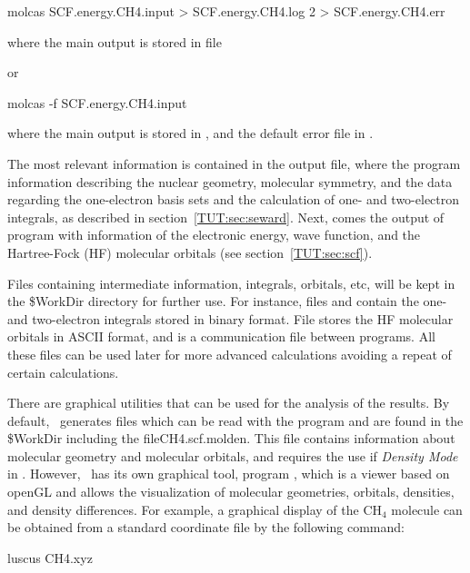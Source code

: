 \begin{inputlisting}
molcas SCF.energy.CH4.input > SCF.energy.CH4.log 2 > SCF.energy.CH4.err
\end{inputlisting}
where the main output is stored in file  

or

\begin{inputlisting}
molcas -f SCF.energy.CH4.input
\end{inputlisting}
where the main output is stored in , and the default error file in . 

The most relevant information is contained in the output file, where the  program 
information describing the nuclear geometry, molecular symmetry, and the data 
regarding the one-electron basis sets and the calculation of one- and 
two-electron integrals, as described in section~\ref{TUT:sec:seward}. Next,
comes the output of program  with information of the electronic
energy, wave function, and the Hartree-Fock (HF) molecular orbitals 
(see section~\ref{TUT:sec:scf}).

Files containing intermediate information, integrals, orbitals, etc, will be 
kept in the {\$WorkDir} directory for further use. For instance, files
 and  contain the one- and
two-electron integrals stored in binary format. File 
stores the HF molecular orbitals in ASCII format, and 
 is a communication file between programs. All these 
files can be used later for more advanced calculations avoiding a 
repeat of certain calculations.

There are graphical utilities that can be used for the analysis of the
results. By default, \molcas\ generates files which can be read with the 
 program and are found in the {\$WorkDir} including the file{CH4.scf.molden}. 
This file contains information about molecular geometry and molecular orbitals, and requires the use if \textit{Density Mode} in .
However, \molcas\ has its own graphical tool, program , which is a viewer based on openGL and allows the visualization of 
molecular geometries, orbitals, densities, and density differences. For 
example, a graphical display of the CH$_4$ molecule can be obtained from a standard coordinate file by the following command:

\begin{inputlisting}
luscus CH4.xyz 
\end{inputlisting}

